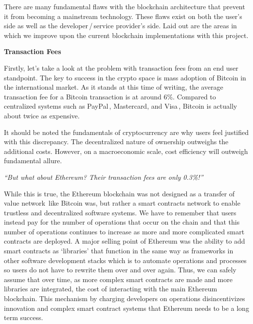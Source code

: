 \documentclass{%
	article}
\begin{document}
There are many fundamental flaws with the blockchain architecture that prevent it from becoming a mainstream technology. These flaws exist on both the user’s side as well as the developer\,/\,service provider’s side. Laid out are the areas in which we improve upon the current blockchain implementations with this project.

\begin{center}
\textbf{Transaction Fees}
\end{center}

Firstly, let’s take a look at the problem with transaction fees from an end user standpoint. The key to success in the crypto space is mass adoption of Bitcoin in the international market. As it stands at this time of writing, the average transaction fee for a Bitcoin transaction is at around 6\%. Compared to centralized systems such as PayPal\,\cite{paypalfees}, Mastercard, and Visa\,\cite{ccfees}, Bitcoin is actually about twice as expensive.

It should be noted the fundamentals of cryptocurrency are why users feel justified with this discrepancy. The decentralized nature of ownership outweighs the additional costs. However, on a macroeconomic scale, cost efficiency will outweigh fundamental allure.

\begin{center}
\textit{“But what about Ethereum? Their transaction fees are only 0.3\%!”}
\end{center}
	
While this is true, the Ethereum blockchain was not designed as a transfer of value network\,\cite{ethereumwp} like Bitcoin was, but rather a smart contracts network to enable trustless and decentralized software systems. We have to remember that users instead pay for the number of operations that occur on the chain and that this number of operations continues to increase as more and more complicated smart contracts are deployed. A major selling point of Ethereum was the ability to add smart contracts as ‘libraries’ that function in the same way as frameworks in other software development stacks which is to automate operations and processes so users do not have to rewrite them over and over again. Thus, we can safely assume that over time, as more complex smart contracts are made and more libraries are integrated, the cost of interacting with the main Ethereum blockchain. This mechanism by charging developers on operations disincentivizes innovation and complex smart contract systems that Ethereum needs to be a long term success.
\end{document}
